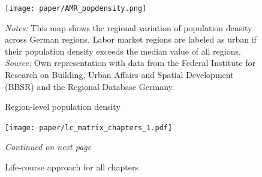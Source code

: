 \documentclass[11pt, a4paper]{article} %
\begin{document}
\vspace*{\fill}
\begin{figure}[H]\centering
	\caption{Region-level population density}\label{fig: AMR_regions_population_density}
	\texttt{[image: paper/AMR\_popdensity.png]}
	\scriptsize
	\begin{minipage}{0.9\linewidth}
		\emph{Notes:} This map shows the regional variation of population density across German regions. Labor market regions are labeled as urban if their population density exceeds the median value of all regions. \newline\emph{Source:} Own representation with data from the Federal Institute for Research on Building, Urban Affairs and Spatial Development (BBSR) and the Regional Database Germany.
	\end{minipage}
\end{figure}
\vspace*{\fill}\clearpage


\begin{figure}[H]\centering
	\caption{Life-course approach for all chapters}\label{fig: appendix_lc_matrix_chapters}
	\texttt{[image: paper/lc\_matrix\_chapters\_1.pdf]}
		\scriptsize
		\begin{minipage}{\linewidth}
			\emph{Continued on next page}
		\end{minipage}
\end{figure}
\end{document}
